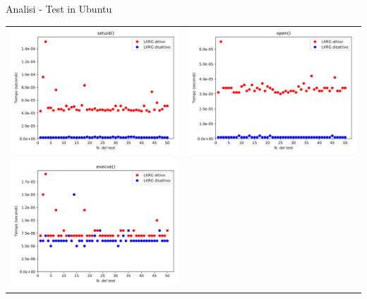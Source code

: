 \documentclass[12pt]{beamer}
\begin{document}
  \begin{frame}[fragile]{Analisi - Test in Ubuntu}
    \begin{tabular}{ c c }
    	\includegraphics[scale=0.11]{res/Ubuntu/Setuid} & 
    	\includegraphics[scale=0.11]{res/Ubuntu/Open}\\
    	\includegraphics[scale=0.11]{res/Ubuntu/Execve} & 

\end{tabular}
\end{frame}
\end{document}
